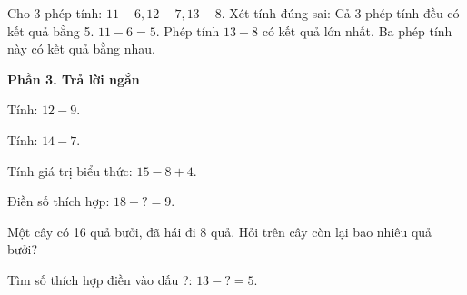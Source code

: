 \begin{ex} %
Cho 3 phép tính: $11 - 6, 12 - 7, 13 - 8$. Xét tính đúng sai:
\choiceTF
{\True Cả 3 phép tính đều có kết quả bằng 5.}
{\True $11 - 6 = 5$.}
{Phép tính $13 - 8$ có kết quả lớn nhất.}
{\True Ba phép tính này có kết quả bằng nhau.}
\end{ex}

\textbf{Phần 3. Trả lời ngắn}

\begin{ex} %
Tính: $12 - 9$.
\end{ex}

\begin{ex} %
Tính: $14 - 7$.
\end{ex}

\begin{ex} %
Tính giá trị biểu thức: $15 - 8 + 4$.
\end{ex}

\begin{ex} %
Điền số thích hợp: $18 - ? = 9$.
\end{ex}

\begin{ex} %
Một cây có 16 quả bưởi, đã hái đi 8 quả. Hỏi trên cây còn lại bao nhiêu quả bưởi?
\end{ex}

\begin{ex} %
Tìm số thích hợp điền vào dấu ?: $13 - ? = 5$.
\end{ex}
